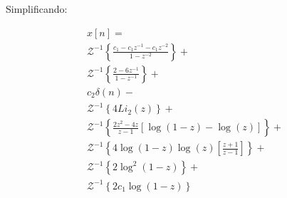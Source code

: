 \documentclass[a4paper,10pt]{article}
\begin{document}
Simplificando:

$$
\begin{array}{lcl} 
 x[n] = \\
 \mathcal{Z}^{-1}\left\{\displaystyle \frac{c_1 - c_1z^{-1} - c_1z^{-2}}{1-z^{-2}}\right\} + \\
 \mathcal{Z}^{-1}\left\{\displaystyle \frac{2  - 6z ^{-1}}{1-z^{-1}}\right\}+\\
 c_2 \delta(n)-\\
 \mathcal{Z}^{-1}\left\{4 Li_2(z)\right\}+\\
 \mathcal{Z}^{-1}\left\{\displaystyle \frac{2 z^2 - 4z}{z-1}\displaystyle \left[\log(1-z) - \log(z)\right]\right\} +\\
 \mathcal{Z}^{-1}\left\{4 \log(1-z)\log(z) \left[\displaystyle \frac{ z  + 1}{z-1}\right]\right\}+\\
 \mathcal{Z}^{-1}\left\{2 \log^2(1-z)\right\} + \\
 \mathcal{Z}^{-1}\left\{2 c_1  \log(1-z)\right\} 
\end{array} 
$$
\end{document}
